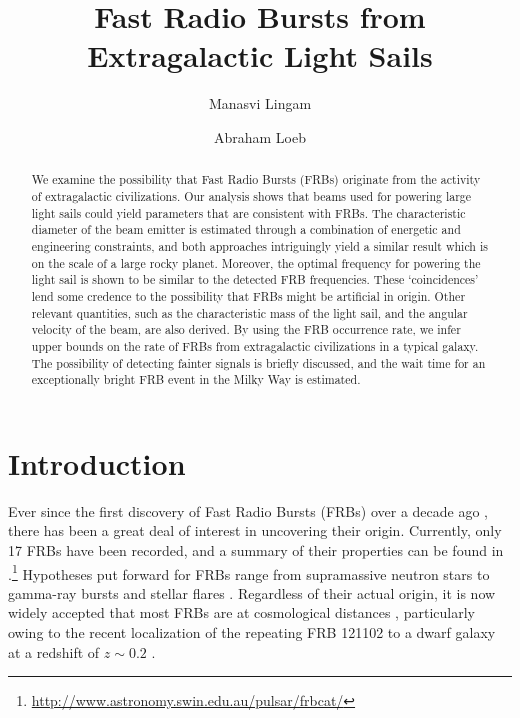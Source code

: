 \documentclass[twocolumn,tighten]{aastex61}
\begin{document}
\title{Fast Radio Bursts from Extragalactic Light Sails}


\author{Manasvi Lingam}

\author{Abraham Loeb}


\begin{abstract}
We examine the possibility that Fast Radio Bursts (FRBs) originate from the activity of extragalactic civilizations. Our analysis shows that beams used for powering large light sails could yield parameters that are consistent with FRBs. The characteristic diameter of the beam emitter is estimated through a combination of energetic and engineering constraints, and both approaches intriguingly yield a similar result which is on the scale of a large rocky planet. Moreover, the optimal frequency for powering the light sail is shown to be similar to the detected FRB frequencies. These `coincidences' lend some credence to the possibility that FRBs might be artificial in origin. Other relevant quantities, such as the characteristic mass of the light sail, and the angular velocity of the beam, are also derived. By using the FRB occurrence rate, we infer upper bounds on the rate of FRBs from extragalactic civilizations in a typical galaxy. The possibility of detecting fainter signals is briefly discussed, and the wait time for an exceptionally bright FRB event in the Milky Way is estimated.
\end{abstract}

\section{Introduction} \label{SecIntro}
Ever since the first discovery of Fast Radio Bursts (FRBs) over a decade ago \citep{LBMNC}, there has been a great deal of interest in uncovering their origin. Currently, only 17 FRBs have been recorded, and a summary of their properties can be found in \citet{Pet16}.\footnote{\url{http://www.astronomy.swin.edu.au/pulsar/frbcat/}} Hypotheses put forward for FRBs range from supramassive neutron stars \citep{FR14} to gamma-ray bursts \citep{Zhang14} and stellar flares \citep{LSM14}. Regardless of their actual origin, it is now widely accepted that most FRBs are at cosmological distances \citep{Thorn13}, particularly owing to the recent localization of the repeating FRB 121102 to a dwarf galaxy at a redshift of $z \sim 0.2$ \citep{Chat17,Tend17}.
\end{document}

